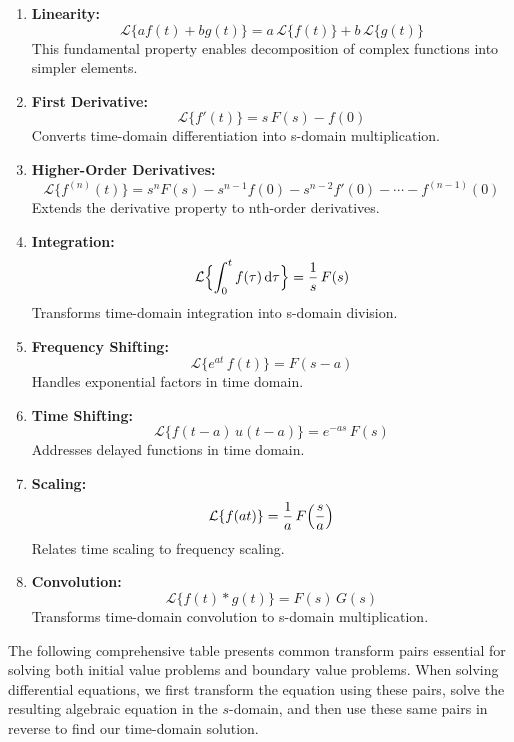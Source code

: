 \begin{enumerate}
\item \textbf{Linearity:}
\[
\mathcal{L}\{a f(t) + b g(t)\} = a\,\mathcal{L}\{f(t)\} + b\,\mathcal{L}\{g(t)\}
\]
This fundamental property enables decomposition of complex functions into simpler elements.

\item \textbf{First Derivative:}
\[
\mathcal{L}\{f'(t)\} = s\,F(s) - f(0)
\]
Converts time-domain differentiation into s-domain multiplication.

\item \textbf{Higher-Order Derivatives:}
\[
\mathcal{L}\{f^{(n)}(t)\} = s^n F(s) - s^{n-1} f(0) - s^{n-2} f'(0) - \cdots - f^{(n-1)}(0)
\]
Extends the derivative property to nth-order derivatives.

\item \textbf{Integration:}
\[
\mathcal{L}\Bigl\{\int_{0}^{t} f(\tau)\,\mathrm{d}\tau\Bigr\} = \frac{1}{s}\,F(s)
\]
Transforms time-domain integration into s-domain division.

\item \textbf{Frequency Shifting:}
\[
\mathcal{L}\{e^{a t} \, f(t)\} = F(s - a)
\]
Handles exponential factors in time domain.

\item \textbf{Time Shifting:}
\[
\mathcal{L}\{f(t-a) \, u(t-a)\} = e^{-a s}\,F(s)
\]
Addresses delayed functions in time domain.

\item \textbf{Scaling:}
\[
\mathcal{L}\{f(a t)\} = \frac{1}{a}\,F\Bigl(\frac{s}{a}\Bigr)
\]
Relates time scaling to frequency scaling.

\item \textbf{Convolution:}
\[
\mathcal{L}\{f(t) * g(t)\} = F(s)\,G(s)
\]
Transforms time-domain convolution to s-domain multiplication.
\end{enumerate}

\noindent
The following comprehensive table presents common transform pairs essential for solving both initial value problems and boundary value problems. When solving differential equations, we first transform the equation using these pairs, solve the resulting algebraic equation in the $s$-domain, and then use these same pairs in reverse to find our time-domain solution.

